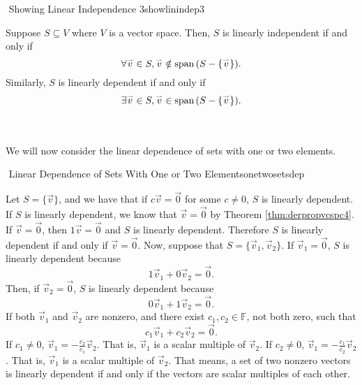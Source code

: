         \begin{theorem}{\Stop\,\,Showing Linear Independence 3}{showlinindep3}
            
            Suppose \(S\subseteq V\) where \(V\) is a vector space. Then, \(S\) is linearly independent if and only if
            \begin{equation*}
                \forall\overset{_{\rightharpoonup}}{v}\in S,\overset{_{\rightharpoonup}}{v}\notin\text{span\,}(S-\{\overset{_{\rightharpoonup}}{v}\}).
            \end{equation*}
            Similarly, \(S\) is linearly dependent if and only if
            \begin{equation*}
                \exists\overset{_{\rightharpoonup}}{v}\in S,\overset{_{\rightharpoonup}}{v}\in\text{span\,}(S-\{\overset{_{\rightharpoonup}}{v}\}).
            \end{equation*}

        \end{theorem}
        \pagebreak
        \vphantom
        \\
        \\
        We will now consider the linear dependence of sets with one or two elements.
        \begin{theorem}{\Stop\,\,Linear Dependence of Sets With One or Two Elements}{onetwosetsdep}

            Let \(S=\{\vec{v}\}\), and we have that if \(c\vec{v}=\vec{0}\) for some \(c\neq0\), \(S\) is linearly dependent. If \(S\) is linearly dependent, we know that \(\vec{v}=\vec{0}\) by Theorem \ref{thm:derpropvcspc4}. If \(\vec{v}=\vec{0}\), then \(1\vec{v}=\vec{0}\) and \(S\) is linearly dependent. Therefore \(S\) is linearly dependent if and only if \(\vec{v}=\vec{0}\). Now, suppose that \(S=\{\vec{v}_1,\vec{v}_2\}\). If \(\vec{v}_1=\vec{0}\), \(S\) is linearly dependent because
            \begin{equation*}
                1\vec{v}_1+0\vec{v}_2=\vec{0}.
            \end{equation*}
            Then, if \(\vec{v}_2=\vec{0}\), \(S\) is linearly dependent because
            \begin{equation*}
                0\vec{v}_1+1\vec{v}_2=\vec{0}.
            \end{equation*}
            If both \(\vec{v}_1\) and \(\vec{v}_2\) are nonzero, and there exist \(c_1,c_2\in\mathbb{F}\), not both zero, such that
            \begin{equation*}
                c_1\vec{v}_1+c_2\vec{v}_2=\vec{0}.
            \end{equation*}
            If \(c_1\neq0\), \(\vec{v}_1=-\frac{c_2}{c_1}\vec{v}_2\). That is, \(\vec{v}_1\) is a scalar multiple of \(\vec{v}_2\). If \(c_2\neq0\), \(\vec{v}_1=-\frac{c_1}{c_2}\vec{v}_2\). That is, \(\vec{v}_1\) is a scalar multiple of \(\vec{v}_2\). That means, a set of two nonzero vectors is linearly dependent if and only if the vectors are scalar multiples of each other.
        
        \end{theorem}
